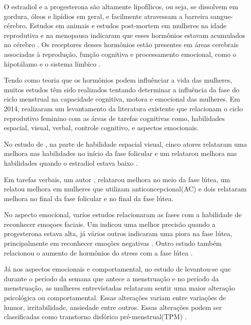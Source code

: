O estradiol e a progesterona são altamente lipofílicos, ou seja, se dissolvem em gordura, óleos e lipídios em geral, e facilmente atravessam a barreira sangue-cérebro. Estudos em animais e estudos post-mortem em mulheres na idade reprodutiva e na menopausa indicaram que esses hormônios estavam acumulados no cérebro \cite{bixo1997}. Os receptores desses hormônios estão presentes em áreas cerebrais associadas à reprodução, função cognitiva e processamento emocional, como o hipotálamo e o sistema límbico \cite{gruber2002, brinton2008}.

Tendo como teoria que os hormônios podem influênciar a vida das mulheres, muitos estudos têm sido realizados tentando determinar a influência da fase do ciclo menstrual na capacidade cognitiva, motora e emocional das mulheres. Em 2014,  realizaram um levantamento da literatura existente que relacionam o ciclo reprodutivo feminino com as áreas de tarefas cognitivas como, habilidades espacial, visual, verbal, controle cognitivo, e aspectos emocionais.

No estudo de , na parte de habilidade espacial visual, cinco atores \cite{hausmann2000, maki2002, courvoisier2013, becker1982, phillips1992} relataram uma melhora nas habilidades no início da fase folicular e um relatarou melhora nas habilidades quando o estradiol estava baixo \cite{hampson2014}. 

Em tarefas verbais, um autor \cite{maki2002}, relatarou melhora no meio da fase lútea, um relatou melhora em mulheres que utilizam anticoncepcional(AC) \cite{mordecai2008} e dois relataram melhora no final da fase folicular e no final da fase lútea\cite{Rosenberg2002, solis2004}.

No aspecto emocional, varios estudos relacionaram as fases com a habilidade de reconhecer emoçoes faciais. Um indicou uma melhor precisão quando a progesterona estava alta, já vários outros indicaram uma piora na fase lútea, principalmente em reconhecer emoções negativas \cite{gasbarri2008}. Outro estudo também relacionou o aumento de hormônios do stress com a fase lútea \cite{kirschbaum1999}.

Já nos aspectos emocionais e comportamental, no estudo de  levantou-se que durante o período da semana que antece a menstruação e no período da menstruação, as mulheres entrevistadas relataram sentir uma maior alteração psicológica ou comportamental. Essas alterações variam entre variações de humor, irritabilidade, ansiedade entre outros. Essas alterações podem ser classificadas como transtorno disfórico pré-menstrual(TPM) \cite{ACOG2000}.

